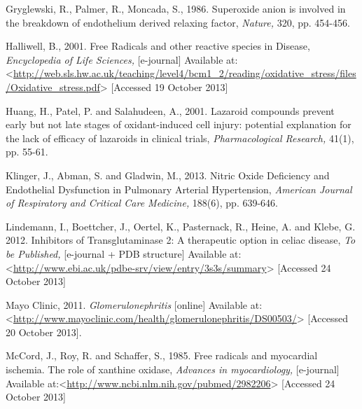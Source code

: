 \documentclass[12pt]{report}
\begin{document}
Gryglewski, R., Palmer, R., Moncada, S., 1986. Superoxide anion is involved in the break­down of endothelium derived relaxing factor, \textit{Nature,} 320, pp. 454-456.
\newline
\newline

Halliwell, B., 2001. Free Radicals and other reactive species in Disease, \textit{Encyclopedia of Life Sciences,} [e-journal] Available at:<\url{http://web.sls.hw.ac.uk/teaching/level4/bcm1_2/reading/oxidative_stress/files/Oxidative_stress.pdf}> [Accessed 19 October 2013]
\newline
\newline

Huang, H., Patel, P. and Salahudeen, A., 2001. Lazaroid compounds prevent early but not late stages of oxidant-induced cell injury: potential explanation for the lack of efficacy of lazaroids in clinical trials, \textit{Pharmacological Research,} 41(1), pp. 55-61.
\newline
\newline

Klinger, J., Abman, S. and Gladwin, M., 2013. Nitric Oxide Deficiency and Endothelial Dysfunction in Pulmonary Arterial Hypertension, \textit{American Journal of Respiratory and Critical Care Medicine,} 188(6), pp. 639-646.
\newline
\newline

Lindemann, I., Boettcher, J., Oertel, K., Pasternack, R., Heine, A. and Klebe, G. 2012. Inhibitors of Transglutaminase 2: A therapeutic option in celiac disease, \textit{To be Published,} [e-journal + PDB structure] Available at:<\url{http://www.ebi.ac.uk/pdbe-srv/view/entry/3s3s/summary}> [Accessed 24 October 2013]
\newline
\newline

Mayo Clinic, 2011. \textit{Glomerulonephritis} [online] Available at: <\url{http://www.mayoclinic.com/health/glomerulonephritis/DS00503/}> [Accessed 20 October 2013].
\newline
\newline

McCord, J., Roy, R. and Schaffer, S., 1985. Free radicals and myocardial ischemia. The role of xanthine oxidase, \textit{Advances in myocardiology,} [e-journal] Available at:<\url{http://www.ncbi.nlm.nih.gov/pubmed/2982206}> [Accessed 24 October 2013]
\newline
\newline
\end{document}
